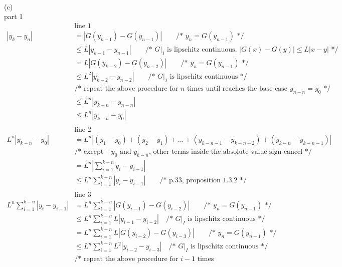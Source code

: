 \documentclass[12pt, border = 4pt, multi]{article} %
\begin{document}
\\
(c)\\
part 1
\begin{align*}
&\text{line 1}\\
|y_k - y_n| &= |G(y_{k - 1}) - G(y_{n - 1})| \qquad \text{/* } y_n = G(y_{n - 1}) \text{ */}\\
&\leq L|y_{k - 1} - y_{n - 1}| \qquad \text{/* $G|_I$ is lipschitz continuous, $|G(x) - G(y)| \leq L|x - y|$ */}\\
&= L|G(y_{k - 2}) - G(y_{n - 2})| \qquad \text{/* } y_n = G(y_{n - 1}) \text{ */}\\
&\leq L ^ 2|y_{k - 2} - y_{n - 2}| \qquad \text{/* $G|_I$ is lipschitz continuous */}\\
&\text{/* repeat the above procedure for $n$ times until reaches the base case $y_{n - n} = y_0$ */}\\
&\leq L ^ n|y_{k - n} - y_{n - n}|\\
&\leq L ^ n|y_{k - n} - y_0|\\
\\
&\text{line 2}\\
L ^ n|y_{k - n} - y_0| &= L ^ n|(y_1 - y_0) + (y_2 - y_1) + ... + (y_{k - n - 1} - y_{k - n - 2}) + (y_{k - n} - y_{k - n - 1})|\\
&\text{/* except $-y_0$ and $y_{k - n}$, other terms inside the absolute value sign cancel */}\\
&= L ^ n\left|\sum_{i = 1} ^ {k - n}y_i - y_{i - 1}\right|\\
&\leq L ^ n \sum_{i = 1} ^ {k - n} \left|y_i - y_{i - 1}\right| \qquad \text{/* p.33, proposition 1.3.2 */}\\
\\
&\text{line 3}\\
L ^ n \sum_{i = 1} ^ {k - n} \left|y_i - y_{i - 1}\right| &= L ^ n \sum_{i = 1} ^ {k - n} \left|G(y_{i - 1}) - G(y_{i - 2})\right| \qquad \text{/* } y_n = G(y_{n - 1}) \text{ */}\\
&\leq L ^ n \sum_{i = 1} ^ {k - n} L\left|y_{i - 1} - y_{i - 2}\right| \quad \text{/* $G|_I$ is lipschitz continuous */}\\
&= L ^ n \sum_{i = 1} ^ {k - n} L\left|G(y_{i - 2}) - G(y_{i - 3})\right| \qquad \text{/* } y_n = G(y_{n - 1}) \text{ */}\\
&\leq L ^ n \sum_{i = 1} ^ {k - n} L ^ 2\left|y_{i - 2} - y_{i - 3}\right| \quad \text{/* $G|_I$ is lipschitz continuous */}\\
&\text{/* repeat the above procedure for $i - 1$ times}\\

\end{align*}
\end{document}
